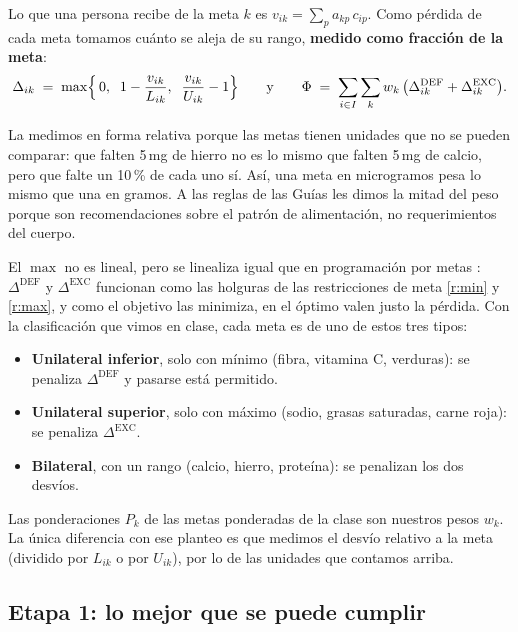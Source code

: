 \documentclass[10pt,a4paper]{article}
\newcommand{\Ddef}{\Delta^{\mathrm{DEF}}}
\newcommand{\Dexc}{\Delta^{\mathrm{EXC}}}
\begin{document}
Lo que una persona recibe de la meta $k$ es $v_{ik} = \sum_p a_{kp}\, c_{ip}$. Como
pérdida de cada meta tomamos cuánto se aleja de su rango, \textbf{medido como
fracción de la meta}:
\[
\Delta_{ik} \;=\; \max\Bigl\{\,0,\;\; 1 - \frac{v_{ik}}{L_{ik}},\;\; \frac{v_{ik}}{U_{ik}} - 1 \Bigr\}
\qquad\text{y}\qquad
\Phi \;=\; \sum_{i \in I} \sum_{k} w_k \,\bigl(\Ddef_{ik} + \Dexc_{ik}\bigr).
\]

La medimos en forma relativa porque las metas tienen unidades que no se pueden
comparar: que falten 5\,mg de hierro no es lo mismo que falten 5\,mg de calcio, pero
que falte un 10\,\% de cada uno sí. Así, una meta en microgramos pesa lo mismo que
una en gramos. A las reglas de las Guías les dimos la mitad del peso porque son
recomendaciones sobre el patrón de alimentación, no requerimientos del cuerpo.

El $\max$ no es lineal, pero se linealiza igual que en programación por metas
\cite{clase-metas}: $\Ddef$ y $\Dexc$ funcionan como las holguras de las
restricciones de meta \eqref{r:min} y \eqref{r:max}, y como el objetivo las
minimiza, en el óptimo valen justo la pérdida. Con la clasificación que vimos en
clase, cada meta es de uno de estos tres tipos:

\begin{itemize}
  \item \textbf{Unilateral inferior}, solo con mínimo (fibra, vitamina C, verduras):
        se penaliza $\Ddef$ y pasarse está permitido.
  \item \textbf{Unilateral superior}, solo con máximo (sodio, grasas saturadas,
        carne roja): se penaliza $\Dexc$.
  \item \textbf{Bilateral}, con un rango (calcio, hierro, proteína): se penalizan los
        dos desvíos.
\end{itemize}

Las ponderaciones $P_k$ de las metas ponderadas de la clase son nuestros pesos
$w_k$. La única diferencia con ese planteo es que medimos el desvío relativo a la
meta (dividido por $L_{ik}$ o por $U_{ik}$), por lo de las unidades que contamos
arriba.

\subsection{Etapa 1: lo mejor que se puede cumplir}
\end{document}
